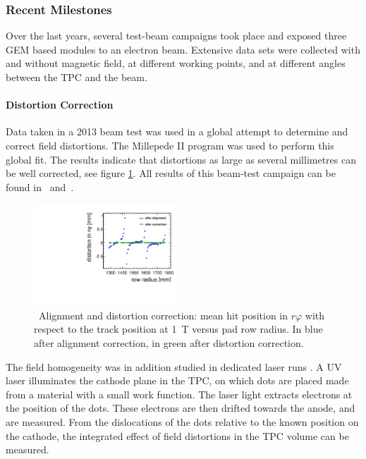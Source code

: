 \subsubsection{Recent Milestones}
Over the last years, several test-beam campaigns took place and exposed three GEM based modules to an electron beam. Extensive data sets were collected with and without magnetic field, at different working points, and at different angles between the TPC and the beam.

\paragraph{Distortion Correction}
Data taken in a 2013 beam test was used in a global attempt to determine and correct field distortions. 
The Millepede II \cite{Blobel20065,millepedeWiki} program was used to perform this global fit. 
The results indicate that distortions as large as several millimetres can be well corrected, see figure \ref{fig:1Tdistort}. 
All results of this beam-test campaign can be found in~\cite{FMueller2017} and~\cite{Mueller:301339}.

\begin{figure}
\centering
\includegraphics[width=0.48\textwidth]{Tracker/TPC_Bonn/plots/TPC-DG_distortionAlignmentPaper1Tdistcor.pdf}
\caption{\small~Alignment and distortion correction: mean hit position in $r\varphi$ with respect to the track position at \SI{1}{T} versus pad row radius. In blue after alignment correction, in green after distortion correction.}
\label{fig:1Tdistort}
\end{figure}

The field homogeneity was in addition studied in dedicated laser runs \cite{Zenker:2014qra}. A UV laser illuminates the cathode plane in the TPC, on which dots are placed made from a material with a small work function. The laser light extracts electrons at the position of the dots. These electrons are then drifted towards the anode, and are measured. From the dislocations of the dots relative to the known position on the cathode, the integrated effect of field distortions in the TPC volume can be measured.

